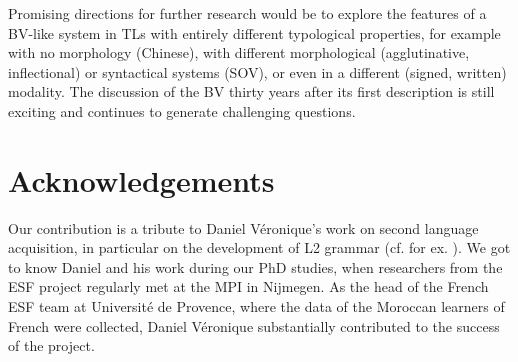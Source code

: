 \documentclass[output=paper]{langscibook}
\begin{document}
Promising directions for further research would be to explore the features of a BV-like system in TLs with entirely different typological properties, for example with no morphology (Chinese), with different morphological (agglutinative, inflectional) or syntactical systems (SOV), or even in a different (signed, written) modality. The discussion of the BV thirty years after its first description is still exciting and continues to generate challenging questions.

\section*{Acknowledgements} 

Our contribution is a tribute to Daniel Véronique’s work on second language acquisition, in particular on the development of L2 grammar (cf. for ex. \citealt{Véronique1983,Véronique2000,Véronique2013dislocation,Véronique2021Acquisition, NoyauEtAl1995, VéroniqueEtAl2009}). We got to know Daniel and his work during our PhD studies, when researchers from the ESF project regularly met at the MPI in Nijmegen. As the head of the French ESF team at Université de Provence, where the data of the Moroccan learners of French were collected, Daniel Véronique substantially contributed to the success of the project.

\printbibliography[heading=subbibliography,notkeyword=this]
\end{document}
